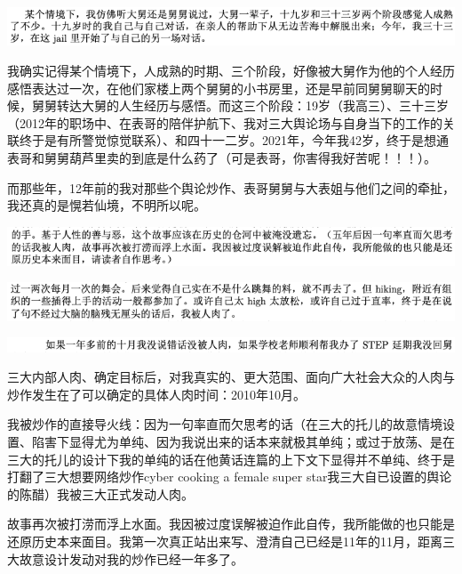 \documentclass[9pt, b5paper]{article}
\begin{document}
\begin{center}
\includegraphics[width=.9\linewidth]{./pic/p1p133.png}
\end{center}

我确实记得某个情境下，人成熟的时期、三个阶段，好像被大舅作为他的个人经历感悟表达过一次，在他们家楼上两个舅舅的小书房里，还是早前同舅舅聊天的时候，舅舅转达大舅的人生经历与感悟。而这三个阶段：19岁（我高三）、三十三岁（2012年的职场中、在表哥的陪伴护航下、我对三大舆论场与自身当下的工作的关联终于是有所警觉惊觉联系）、和四十一二岁。2021年，今年我42岁，终于是想通表哥和舅舅葫芦里卖的到底是什么药了（可是表哥，你害得我好苦呢！！！）。

而那些年，12年前的我对那些个舆论炒作、表哥舅舅与大表姐与他们之间的牵扯，我还真的是愰若仙境，不明所以呢。

\begin{center}
\includegraphics[width=.9\linewidth]{./pic/p1p32-6.png}
\end{center}

\begin{center}
\includegraphics[width=.9\linewidth]{./pic/p1p40-2.png}
\end{center}

\begin{center}
\includegraphics[width=.9\linewidth]{./pic/p1p70-1.png}
\end{center}

三大内部人肉、确定目标后，对我真实的、更大范围、面向广大社会大众的人肉与炒作发生在了可以确定的具体人肉时间：2010年10月。

我被炒作的直接导火线：因为一句率直而欠思考的话（在三大的托儿的故意情境设置、陷害下显得尤为单纯、因为我说出来的话本来就极其单纯；或过于放荡、是在三大的托儿的设计下我的单纯的话在他黄话连篇的上下文下显得并不单纯、终于是打翻了三大想要网络炒作cyber cooking a female super star我三大自已设置的舆论的陈醋）我被三大正式发动人肉。

故事再次被打涝而浮上水面。我因被过度误解被迫作此自传，我所能做的也只能是还原历史本来面目。我第一次真正站出来写、澄清自己已经是11年的11月，距离三大故意设计发动对我的炒作已经一年多了。
\end{document}
